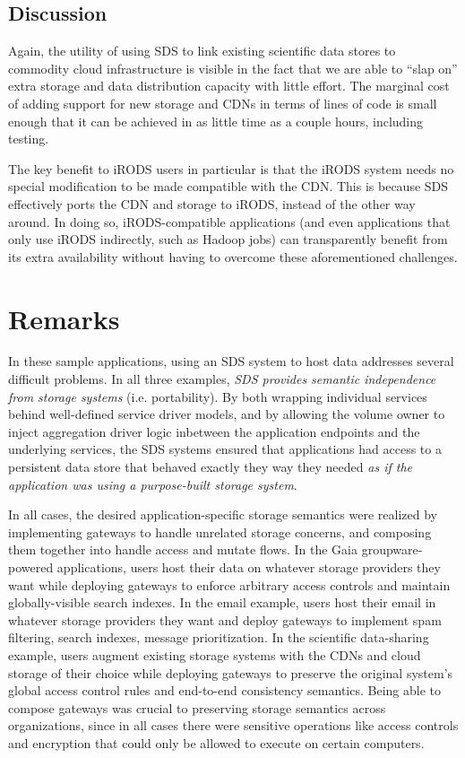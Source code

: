 \subsection{Discussion}

Again, the utility of using SDS to link existing scientific data stores to
commodity cloud infrastructure is visible in the fact that we are able to ``slap
on'' extra storage and data distribution capacity with little effort.  The
marginal cost of adding support for new storage and CDNs in terms of lines of
code is small enough that it can be achieved in as little time as a couple
hours, including testing.

The key benefit to iRODS users in particular is that the iRODS system needs no
special modification to be made compatible with the CDN.  This is because
SDS effectively ports the CDN and storage to iRODS, instead of the other way around.
In doing so, iRODS-compatible applications (and even applications that only use
iRODS indirectly, such as Hadoop jobs) can transparently benefit from its extra
availability without having to overcome these aforementioned challenges.

\section{Remarks}

In these sample applications, using an SDS system to host data addresses
several difficult problems.  In all three examples, 
\emph{SDS provides semantic independence from storage systems} (i.e.
portability).  By both wrapping individual services behind well-defined service driver models, and by
allowing the volume owner to inject aggregation driver logic inbetween the
application endpoints and the underlying services, the SDS systems ensured that applications
had access to a persistent data store that behaved exactly they way they needed
\emph{as if the application was using a purpose-built storage system}.

In all cases, the desired application-specific storage semantics were realized
by implementing gateways to handle unrelated storage concerns, and composing them
together into handle access and mutate flows.
In the Gaia groupware-powered applications, users host their data on whatever storage providers they want
while deploying gateways to enforce arbitrary access controls and maintain globally-visible search
indexes.  In the email example, users host
their email in whatever storage providers they want and deploy gateways to
implement spam filtering, search indexes, message prioritization.  In the scientific
data-sharing example, users augment existing storage systems with the CDNs and cloud
storage of their choice while deploying gateways to preserve the original system's global access
control rules and end-to-end consistency semantics.  Being able to compose
gateways was crucial to preserving storage semantics across organizations, since
in all cases there were sensitive operations like access controls and encryption
that could only be allowed to execute on certain computers.

